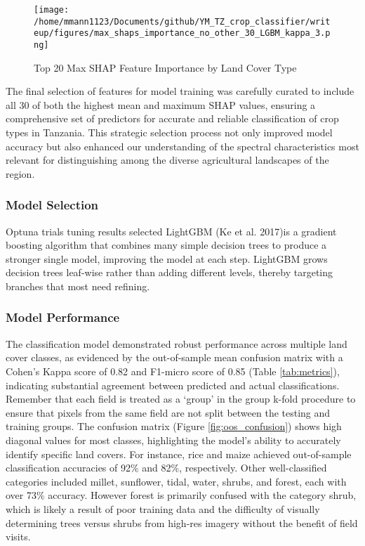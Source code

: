 \documentclass[
  journal,
  twocolumn]{IEEEtran}
\begin{document}
\begin{figure}[H]
    \centering
    \texttt{[image: /home/mmann1123/Documents/github/YM\_TZ\_crop\_classifier/writeup/figures/max\_shaps\_importance\_no\_other\_30\_LGBM\_kappa\_3.png]} %
    \caption{Top 20 Max SHAP Feature Importance by Land Cover Type}
    \label{fig:max_shaps} %
\end{figure}

The final selection of features for model training was carefully curated
to include all 30 of both the highest mean and maximum SHAP values,
ensuring a comprehensive set of predictors for accurate and reliable
classification of crop types in Tanzania. This strategic selection
process not only improved model accuracy but also enhanced our
understanding of the spectral characteristics most relevant for
distinguishing among the diverse agricultural landscapes of the region.

\hypertarget{model-selection}{%
\subsubsection{Model Selection}\label{model-selection}}

Optuna trials tuning results selected LightGBM (Ke et al. 2017)is a
gradient boosting algorithm that combines many simple decision trees to
produce a stronger single model, improving the model at each step.
LightGBM grows decision trees leaf-wise rather than adding different
levels, thereby targeting branches that most need refining.

\hypertarget{model-performance}{%
\subsubsection{Model Performance}\label{model-performance}}

The classification model demonstrated robust performance across multiple
land cover classes, as evidenced by the out-of-sample mean confusion
matrix with a Cohen's Kappa score of 0.82 and F1-micro score of 0.85
(Table \ref{tab:metrics}), indicating substantial agreement between
predicted and actual classifications. Remember that each field is
treated as a `group' in the group k-fold procedure to ensure that pixels
from the same field are not split between the testing and training
groups. The confusion matrix (Figure \ref{fig:oos_confusion}) shows high
diagonal values for most classes, highlighting the model's ability to
accurately identify specific land covers. For instance, rice and maize
achieved out-of-sample classification accuracies of 92\% and 82\%,
respectively. Other well-classified categories included millet,
sunflower, tidal, water, shrubs, and forest, each with over 73\%
accuracy. However forest is primarily confused with the category shrub,
which is likely a result of poor training data and the difficulty of
visually determining trees versus shrubs from high-res imagery without
the benefit of field visits.
\end{document}
